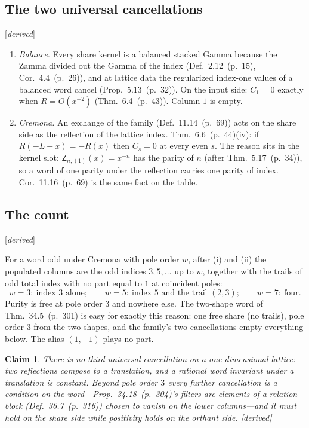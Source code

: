 \documentclass[11pt]{article}
\newcommand{\sZ}{\mathsf Z}
\newcommand{\status}[1]{\hfill{\small[\textit{#1}]}}
\newcommand{\hb}[2]{#1~(p.~#2)}   %
\theoremstyle{plain}
\newtheorem{claim}{Claim}[section]
\theoremstyle{remark}
\begin{document}
\subsection{The two universal cancellations}\status{derived}

\begin{enumerate}[label=(\roman*)]
\item \emph{Balance.} Every share kernel is a balanced stacked Gamma because the Zamma divided out the Gamma of the index (Def.~\hb{2.12}{15}, Cor.~\hb{4.4}{26}), and at lattice data the regularized index-one values of a balanced word cancel (Prop.~\hb{5.13}{32}). On the input side: $C_1=0$ exactly when $R=O(x^{-2})$ (Thm.~\hb{6.4}{43}). Column $1$ is empty.
\item \emph{Cremona.} An exchange of the family (Def.~\hb{11.14}{69}) acts on the share side as the reflection of the lattice index. Thm.~\hb{6.6}{44}(iv): if $R(-L-x)=-R(x)$ then $C_s=0$ at every even $s$. The reason sits in the kernel slot: $\sZ_{n;(1)}(x)=x^{-n}$ has the parity of $n$ (after Thm.~\hb{5.17}{34}), so a word of one parity under the reflection carries one parity of index. Cor.~\hb{11.16}{69} is the same fact on the table.
\end{enumerate}

\subsection{The count}\status{derived}

For a word odd under Cremona with pole order $w$, after (i) and (ii) the populated columns are the odd indices $3,5,\dots$ up to $w$, together with the trails of odd total index with no part equal to $1$ at coincident poles:
\[
w=3:\ \text{index }3\text{ alone};\qquad w=5:\ \text{index }5\text{ and the trail }(2,3);\qquad w=7:\ \text{four}.
\]
Purity is free at pole order $3$ and nowhere else. The two-shape word of Thm.~\hb{34.5}{301} is easy for exactly this reason: one free share (no trails), pole order $3$ from the two shapes, and the family's two cancellations empty everything below. The alias $(1,-1)$ plays no part.

\begin{claim}
There is no third universal cancellation on a one-dimensional lattice: two reflections compose to a translation, and a rational word invariant under a translation is constant. Beyond pole order $3$ every further cancellation is a condition on the word---Prop.~\hb{34.18}{304}'s filters are elements of a relation block (Def.~\hb{36.7}{316}) chosen to vanish on the lower columns---and it must hold on the share side while positivity holds on the orthant side. \status{derived}
\end{claim}
\end{document}
